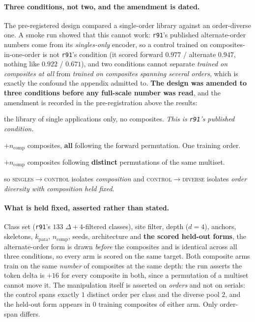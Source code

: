 \paragraph{Three conditions, not two, and the amendment is dated.} The pre-registered design compared a single-order library against an order-diverse one. A smoke run showed that this cannot work: \texttt{r91}'s published alternate-order numbers come from its \emph{singles-only} encoder, so a control trained on composites-in-one-order is not \texttt{r91}'s condition (it scored forward $0.977$ / alternate $0.947$, nothing like $0.922$ / $0.671$), and two conditions cannot separate \emph{trained on composites at all} from \emph{trained on composites spanning several orders}, which is exactly the confound the appendix admitted to. \textbf{The design was amended to three conditions before any full-scale number was read}, and the amendment is recorded in the pre-registration above the results:
\begin{description}[noitemsep,topsep=2pt,leftmargin=1.2em]
  \item[singles] the library of single applications only, no composites. \emph{This is \texttt{r91}'s published condition.}
  \item[control] $+n_{\mathrm{comp}}$ composites, \textbf{all} following the forward permutation. One training order.
  \item[diverse] $+n_{\mathrm{comp}}$ composites following \textbf{distinct} permutations of the same multiset.
\end{description}
\noindent so \textsc{singles}$\to$\textsc{control} isolates \emph{composition} and \textsc{control}$\to$\textsc{diverse} isolates \emph{order diversity with composition held fixed}.

\paragraph{What is held fixed, asserted rather than stated.} Class set (\texttt{r91}'s $133$ $\Delta{+}4$-filtered classes), site filter, depth ($d{=}4$), anchors, skeletons, $k_{\mathrm{para}}$, $n_{\mathrm{comp}}$, seeds, architecture and \textbf{the scored held-out forms}, the alternate-order form is drawn \emph{before} the composites and is identical across all three conditions, so every arm is scored on the same target. Both composite arms train on the same \emph{number} of composites at the same depth: the run asserts the token delta is $+16$ for every composite in both, since a permutation of a multiset cannot move it. The manipulation itself is asserted on \emph{orders} and not on serials: the control spans exactly $1$ distinct order per class and the diverse pool $2$, and the held-out form appears in $0$ training composites of either arm. Only order-span differs.

